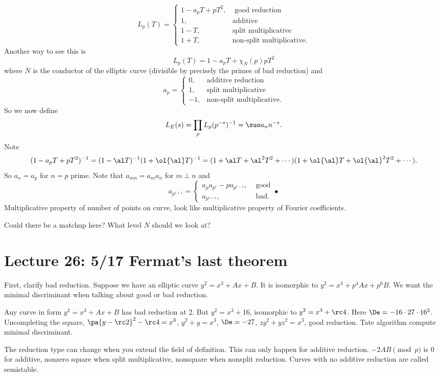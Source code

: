 \[
L_p(T)=\begin{cases}
1-a_pT+pT^2,&\text{ good reduction}\\
1,&\text{additive}\\
1-T,&\text{split multiplicative}\\
1+T,&\text{non-split multiplicative.}
\end{cases}
\]
Another way to see this is
\[
L_p(T)=1-a_pT+\chi_N(p)pT^2
\]
where $N$ is the conductor of the elliptic curve (divisible by precisely the primes of bad reduction) and 
\[
a_p=\begin{cases}
0,&\text{additive reduction}\\
1,&\text{split multiplicative}\\
-1,&\text{non-split multiplicative.}
\end{cases}
\]
So we now define
\[
L_E(s)=\prod_pL_p(p^{-s})^{-1} =\suo a_nn^{-s}.
\]
Note 
\[
(1-a_pT+pT^2)^{-1}=(1-\al T)^{-1}(1+\ol{\al} T)^{-1}
=(1+\al T+\al^2T^2+\cdots )(1+\ol{\al} T+\ol{\al}^2T^2+\cdots ).
\]
So $a_n=a_p$ for $n=p$ prime. Note that $a_{mn}=a_ma_n$ for $m\perp n$ and
\[
a_{p^{r+1}}=\begin{cases}
a_pa_{p^r}-pa_{p^{r-1}},&\text{ good}\\
a_{p^{r+1}},&\text{ bad}.
\end{cases}•
\]
Multiplicative property of number of points on curve, look like multiplicative property of Fourier coefficients.

Could there be a matchup here? What level $N$ should we look at?
\section{Lecture 26: 5/17 Fermat's last theorem}
First, clarify bad reduction. Suppose we have an elliptic curve $y^2=x^3+Ax+B$. It is isomorphic to $y^2=x^3+p^4Ax+p^6B$. We want the minimal discriminant when talking about good or bad reduction.

Any curve in form $y^2=x^3+Ax+B$ has bad reduction at 2. But $y^2=x^3+16$, isomorphic to $y^2=x^3+\rc 4$. 
Here $\De=-16\cdot 27\cdot 16^2$. 
Uncompleting the square, $\pa{y-\rc 2}^2-\rc 4=x^3$, $y^2+y=x^3$, $\De=-27$, $zy^2+yz^2=x^3$, good reduction. 
Tate algorithm compute minimal discriminant.

The reduction type can change when you extend the field of definition. This can only happen for additive reduction. $-2AB\pmod p$ is 0 for additive, nonzero square when split multiplicative, nonsquare when nonsplit reduction.
Curves with no additive reduction are called semistable.

